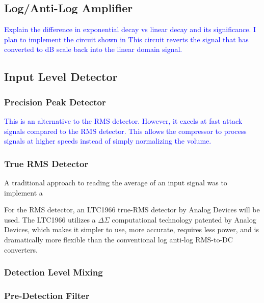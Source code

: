 \documentclass[10pt]{article}
\begin{document}
\begin{multicols*}{2}
            \subsection{Log/Anti-Log Amplifier}
                \textcolor{blue}{Explain the difference in exponential decay vs linear decay and its significance. I plan to implement the circuit shown in \cite{ti-log-conv}}
                \textcolor{blue}{This circuit reverts the signal that has converted to dB scale back into the linear domain signal.}
            
            \subsection{Input Level Detector}

                \subsubsection{Precision Peak Detector}
                    \textcolor{blue}{This is an alternative to the RMS detector. However, it excels at fast attack signals compared to the RMS detector. This allows the compressor to process signals at higher speeds instead of simply normalizing the volume.}  

                \subsubsection{True RMS Detector}
                    A traditional approach to reading the average of an input signal was to implement a 
                    
                    For the RMS detector, an LTC1966 true-RMS detector by Analog Devices will be used. The LTC1966 utilizes a $\Delta\Sigma$ computational technology patented by Analog Devices, which makes it simpler to use, more accurate, requires less power, and is dramatically more flexible than the conventional log anti-log RMS-to-DC converters.                          
            
                \subsubsection{Detection Level Mixing}

                \subsubsection{Pre-Detection Filter}


\end{multicols*}
\end{document}
